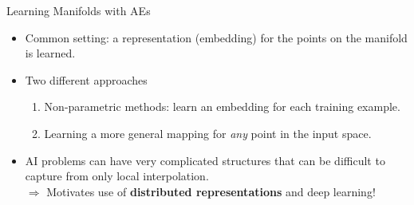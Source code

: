 \begin{vbframe}{Learning Manifolds with AEs}
\begin{itemize}
   \end{itemize}

\framebreak

    \begin{itemize}
        \item Common setting: a representation (embedding) for the points on the manifold is learned.
        \item Two different approaches
            \begin{enumerate}
                \item Non-parametric methods: learn an embedding for each training example.
                \item Learning a more general mapping for \textit{any} point in the input space.
            \end{enumerate}
        \item %
        AI problems can have very complicated structures that can be difficult to capture from only local interpolation.\\
            $\Rightarrow$ Motivates use of \textbf{distributed representations} and deep learning!
    \end{itemize}
\end{vbframe}




\endlecture
